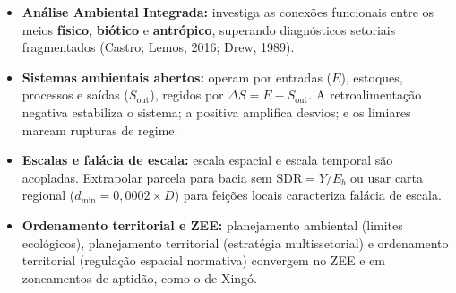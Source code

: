 \begin{boxResumo}
  \begin{itemize}[leftmargin=1.5em, itemsep=2.5pt]
    \item \textbf{Análise Ambiental Integrada:} investiga as conexões funcionais entre os meios \textbf{físico}, \textbf{biótico} e \textbf{antrópico}, superando diagnósticos setoriais fragmentados (Castro; Lemos, 2016; Drew, 1989).
    \item \textbf{Sistemas ambientais abertos:} operam por entradas ($E$), estoques, processos e saídas ($S_{\text{out}}$), regidos por $\Delta S = E - S_{\text{out}}$. A retroalimentação negativa estabiliza o sistema; a positiva amplifica desvios; e os limiares marcam rupturas de regime.
    \item \textbf{Escalas e falácia de escala:} escala espacial e escala temporal são acopladas. Extrapolar parcela para bacia sem $\text{SDR} = Y / E_b$ ou usar carta regional ($d_{\min} = 0{,}0002 \times D$) para feições locais caracteriza falácia de escala.
    \item \textbf{Ordenamento territorial e ZEE:} planejamento ambiental (limites ecológicos), planejamento territorial (estratégia multissetorial) e ordenamento territorial (regulação espacial normativa) convergem no ZEE e em zoneamentos de aptidão, como o de Xingó.
  \end{itemize}
\end{boxResumo}

